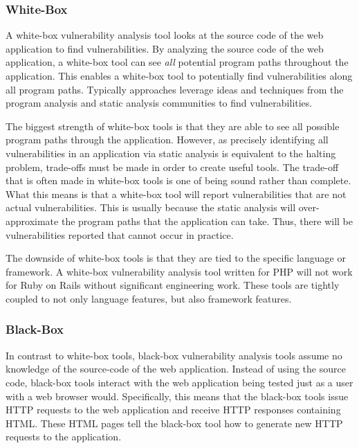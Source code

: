 \subsubsection{White-Box}

A white-box vulnerability analysis tool looks at the source code of
the web application to find vulnerabilities. By analyzing the source
code of the web application, a white-box tool can see \emph{all}
potential program paths throughout the application. This enables a
white-box tool to potentially find vulnerabilities along all program
paths. Typically approaches leverage ideas and techniques from the
program analysis and static analysis communities to find
vulnerabilities.

The biggest strength of white-box tools is that they are able to see
all possible program paths through the application. However, as
precisely identifying all vulnerabilities in an application via static
analysis is equivalent to the halting problem, trade-offs must be made
in order to create useful tools. The trade-off that is often made in
white-box tools is one of being sound rather than complete. What this
means is that a white-box tool will report vulnerabilities that are
not actual vulnerabilities. This is usually because the static
analysis will over-approximate the program paths that the application
can take. Thus, there will be vulnerabilities reported that cannot
occur in practice.

The downside of white-box tools is that they are tied to the specific
language or framework. A white-box vulnerability analysis tool written
for PHP will not work for Ruby on Rails without significant
engineering work. These tools are tightly coupled to not only language
features, but also framework features. 

\subsubsection{Black-Box}

In contrast to white-box tools, black-box vulnerability analysis tools
assume no knowledge of the source-code of the web application. Instead
of using the source code, black-box tools interact with the web
application being tested just as a user with a web browser would.
Specifically, this means that the black-box tools issue HTTP requests
to the web application and receive HTTP responses containing HTML.
These HTML pages tell the black-box tool how to generate new HTTP
requests to the application.

